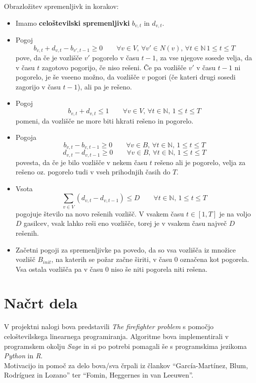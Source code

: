 \documentclass[a4paper, 11pt]{article}
\begin{document}
\noindent Obrazložitev spremenljivk in korakov:
\begin{itemize}
    \item Imamo \textbf{celoštevilski spremenljivki} $b_{v,t}$ in $d_{v,t}$.
    \item Pogoj $$b_{v,t} + d_{v,t} - b_{v',t-1} \ge 0 \qquad \forall v \in V ,\, \forall v' \in N(v) ,\, \forall t \in \mathbb{N} \, 1 \le t \le T $$
    pove, da če je vozlišče $v'$ pogorelo v času $t-1$, za vse njegove sosede velja, da v času $t$  zagotovo pogorijo, če 
    niso rešeni. Če pa vozlišče $v'$ v času $t-1$ ni pogorelo, je še vseeno možno, da 
    vozlišče $v$ pogori (če kateri drugi sosedi zagorijo v času $t-1$), ali pa je rešeno.
    \item Pogoj $$b_{v,t} + d_{v,t} \le 1 \qquad \forall v \in V ,\, \forall t \in \mathbb{N} ,\, 1 \le t \le T$$
    pomeni, da vozlišče ne more biti hkrati rešeno in pogorelo.
    \item Pogoja $$b_{v,t} - b_{v,t-1} \ge 0 \qquad \forall v \in B ,\, \forall t \in \mathbb{N} ,\, 1 \le t \le T$$
    $$d_{v,t} - d_{v,t-1} \ge 0 \qquad \forall v \in B ,\, \forall t \in \mathbb{N} ,\, 1 \le t \le T$$
    povesta, da če je bilo vozlišče v nekem času $t$ rešeno ali je pogorelo, velja za rešeno oz. pogorelo tudi v vseh prihodnjih časih do $T$.
    \item Vsota $$\sum_{v \in V}{\left( d_{v,t} - d_{v, t-1} \right)} \le D \qquad \forall t \in \mathbb{N} ,\, 1 \le t \le T$$
    pogojuje število na novo rešenih vozlišč. V vsakem času $t \in  [1, T]$ je na voljo $D$ gasilcev, vsak lahko reši
    eno vozlišče, torej je v vsakem času največ $D$ rešenih. 
    \item  Začetni pogoji za spremenljivke pa povedo, da so vsa vozlišča iz množice vozlišč $B_{init}$, na 
    katerih se požar začne širiti, v času $0$ označena kot pogorela. 
    Vsa ostala vozlišča pa v času $0$ niso še niti pogorela niti rešena. \\
\end{itemize}

\section{Načrt dela}

\noindent V projektni nalogi bova predstavili \emph{The firefighter problem} s pomočjo
celoštevilskega linearnega programiranja. Algoritme bova implementirali
v programskem okolju \emph{Sage} in si po potrebi pomagali še s programskima
jezikoma \emph{Python} in \emph{R}. \\
Motivacijo in pomoč za delo bova/sva črpali iz člankov ``García-Martínez, Blum, Rodríguez in Lozano''\cite{garcia2015} ter
``Fomin, Heggernes in van Leeuwen''\cite{fomin2015}. \\




\end{document}
